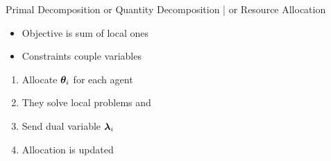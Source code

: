 \documentclass[aspectratio=169]{beamer}
\begin{document}
\begin{frame}{Primal Decomposition }{or Quantity Decomposition | or Resource Allocation}
  \begin{minipage}[c]{.45\linewidth}
    \begin{itemize}
      \item<2-> Objective is sum of local ones
      \item<3-> Constraints couple variables
    \end{itemize}
  \end{minipage}
  \hfill
  \begin{minipage}[c]{.45\linewidth}
  \end{minipage}

  \begin{minipage}[c]{.5\linewidth}
    \begin{enumerate}
      \item<5-> Allocate $\boldsymbol{\theta}_{i}$ for each agent
      \item<6-> They solve local problems and
      \item<7-> Send dual variable $\boldsymbol{\lambda}_{i}$
      \item<8-> Allocation is updated 
    \end{enumerate}
  \end{minipage}
  \hfill
  \begin{minipage}[c]{.45\linewidth}
  \end{minipage}
\end{frame}
\end{document}
